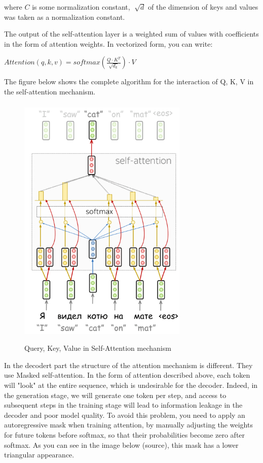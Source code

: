 \documentclass[PMI,VKR]{HSEUniversity}
\begin{document}
where $C$ is some normalization constant, $\sqrt[]{d}$ of the dimension of keys and values was taken as a normalization constant. 

The output of the self-attention layer is a weighted sum of values with coefficients in the form of attention weights. In vectorized form, you can write:

\begin{center}
    $Attention(q, k, v) = softmax(\frac{Q \cdot K^T}{\sqrt{d_k}}) \cdot V $
\end{center}

The figure below shows the complete algorithm for the interaction of Q, K, V in the self-attention mechanism.

\begin{figure}[h]
    \centering
    \includegraphics[scale=1]{img/query-key-value.png}
    \caption{Query, Key, Value in Self-Attention mechanism}
\end{figure}

In the decodert part the structure of the attention mechanism is different. 
They use Masked self-attention. In the form of attention described above, each token will "look" at the entire sequence, which is undesirable for the decoder. 
Indeed, in the generation stage, we will generate one token per step, and access to subsequent steps in the training stage will lead to information leakage in the decoder and poor model quality. 
To avoid this problem, you need to apply an autoregressive mask when training attention, by manually adjusting the
weights for future tokens before softmax, so that their probabilities become zero after softmax. As you can see in the image below (source), this mask has a lower triangular appearance.
\end{document}

